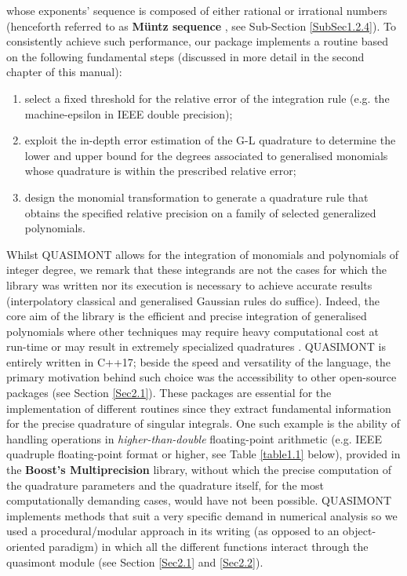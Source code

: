 \documentclass[a4paper, twosided]{book}
\begin{document}
whose exponents' sequence is composed of either rational or irrational numbers (henceforth referred to as \color{poliDarkBlue} \textbf{Müntz sequence} \color{black}, see Sub-Section \ref{SubSec1.2.4}). To consistently achieve such performance, our package implements a routine based on the following fundamental steps (discussed in more detail in the second chapter of this manual):
\begin{enumerate}
    \item select a fixed threshold for the relative error of the integration rule (e.g. the machine-epsilon in IEEE double precision);
    \item exploit the in-depth error estimation of the G-L quadrature to determine the lower and upper bound for the degrees associated to generalised monomials whose quadrature is within the prescribed relative error;
    \item design the monomial transformation to generate a quadrature rule that obtains the specified relative precision on a family of selected generalized polynomials.
\end{enumerate}

Whilst QUASIMONT allows for the integration of monomials and polynomials of integer degree, we remark that these integrands are not the cases for which the library was written nor its execution is necessary to achieve accurate results (interpolatory classical and generalised Gaussian rules do suffice). Indeed, the core aim of the library is the efficient and precise integration of generalised polynomials where other techniques may require heavy computational cost at run-time \cite{Gautschi94} or may result in extremely specialized quadratures \cite{Ma1996,Milovanovic2015}. QUASIMONT is entirely written in C++17; beside the speed and versatility of the language, the primary motivation behind such choice was the accessibility to other open-source packages (see Section \ref{Sec2.1}). These packages are essential for the implementation of different routines since they extract fundamental information for the precise quadrature of singular integrals. One such example is the ability of handling operations in \textsl{higher-than-double} floating-point arithmetic (e.g. IEEE quadruple floating-point format or higher, see Table \ref{table1.1} below), provided in the \color{poliDarkBlue} \textbf{Boost's Multiprecision} \color{black} library, without which the precise computation of the quadrature parameters and the quadrature itself, for the most computationally demanding cases, would have not been possible. QUASIMONT implements methods that suit a very specific demand in numerical analysis so we used a procedural/modular approach in its writing (as opposed to an object-oriented paradigm) in which all the different functions interact through the \colorbox{poliGrayBlue}{quasimont} \color{black} module (see Section \ref{Sec2.1} and \ref{Sec2.2}).
\end{document}
